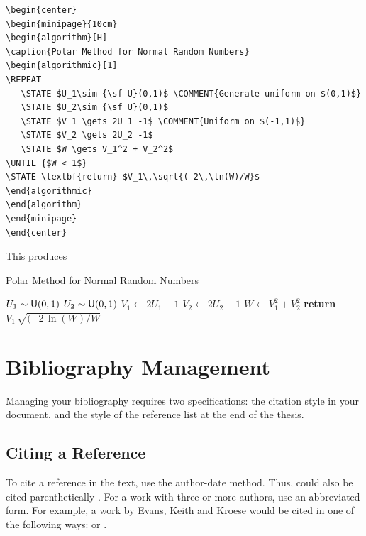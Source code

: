 \documentclass[a4paper,11pt]{article}
\theoremstyle{plain}
\theoremstyle{definition}
\begin{document}
{\small
\begin{verbatim}
\begin{center}
\begin{minipage}{10cm}
\begin{algorithm}[H]
\caption{Polar Method for Normal Random Numbers}
\begin{algorithmic}[1]
\REPEAT
   \STATE $U_1\sim {\sf U}(0,1)$ \COMMENT{Generate uniform on $(0,1)$}
   \STATE $U_2\sim {\sf U}(0,1)$
   \STATE $V_1 \gets 2U_1 -1$ \COMMENT{Uniform on $(-1,1)$}
   \STATE $V_2 \gets 2U_2 -1$
   \STATE $W \gets V_1^2 + V_2^2$
\UNTIL {$W < 1$}
\STATE \textbf{return} $V_1\,\sqrt{(-2\,\ln(W)/W}$
\end{algorithmic}
\end{algorithm}
\end{minipage}
\end{center}
\end{verbatim}
}

\noindent
This produces

\begin{center}
\begin{minipage}{10cm}
\begin{algorithm}[H]
\caption{Polar Method for Normal Random Numbers}
\begin{algorithmic}[1]
\REPEAT
   \STATE $U_1\sim {\sf U}(0,1)$ 
   \STATE $U_2\sim {\sf U}(0,1)$
   \STATE $V_1 \gets 2U_1 -1$ 
   \STATE $V_2 \gets 2U_2 -1$
   \STATE $W \gets V_1^2 + V_2^2$
\STATE \textbf{return} $V_1\,\sqrt{(-2\,\ln(W)/W}$
\end{algorithmic}
\end{algorithm}
\end{minipage}
\end{center}

\section{Bibliography Management}
Managing your bibliography requires two specifications:
the citation style in your document,
and the style of the reference list at the end of the thesis.

\subsection{Citing a Reference}
To cite a reference in the text, use the author-date method. Thus,
\citet{ross06} could also be cited parenthetically \citep{ross06}.
For a work with three or more authors, use an abbreviated form.
For example, a work by Evans, Keith and Kroese would be cited in
one of the following ways:
\citet{evkekro07} or \citep{evkekro07}.
\end{document}
